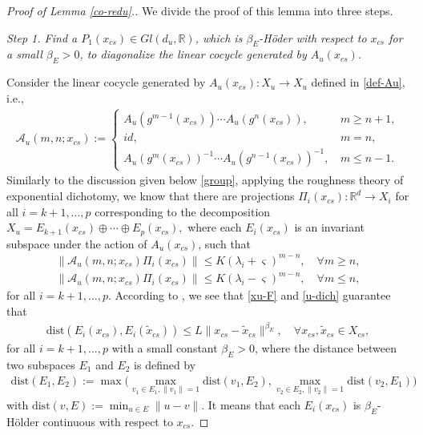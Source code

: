 \documentclass[reqno]{amsart}
\numberwithin{equation}{section}
\begin{document}
\begin{proof}[Proof of Lemma {\rm \ref{co-redu}}.]
We divide the proof of this lemma into three steps.

{\em Step 1.
Find a $P_1(x_{cs})\in Gl(d_u,\mathbb{R})$, which is $\beta_{E}$-H\"{o}der with respect to $x_{cs}$ for a small $\beta_E>0$, to diagonalize the linear cocycle generated by
$A_u(x_{cs})$. }

Consider the linear cocycle generated by $A_u(x_{cs}):X_u\to X_u$ defined in \eqref{def-Au}, i.e.,
\begin{align}\label{group-1}
\mathcal{A}_u(m,n;x_{cs}):=
\begin{cases}
 A_u(g^{m-1}(x_{cs})) \cdots A_u(g^{n}(x_{cs})), \, & m\ge n+1,
\\
id, \, & m=n,
\\
A_u(g^m(x_{cs}))^{-1} \cdots A_u(g^{n-1}(x_{cs}))^{-1}, \, & m\le n-1.
\end{cases}
\end{align}
Similarly to the discussion given below \eqref{group}, applying the roughness theory
 of exponential dichotomy, we know that there are projections $\Pi_i(x_{cs}): \mathbb{R}^d\to X_i$ for all $i=k+1,...,p$ corresponding to the decomposition
 $
X_u=E_{k+1}(x_{cs})\oplus\cdots\oplus E_p(x_{cs}),
 $
 where each $E_i(x_{cs})$ is an invariant subspace under the action of $A_u(x_{cs})$,
 such that
\begin{equation}\label{u-dich}
\begin{split}
\|\mathcal{A}_u(m,n;x_{cs})\Pi_i(x_{cs})\| \le K (\lambda_i + \varsigma)^{m-n}, \quad \forall m\ge n,
\\
\|\mathcal{A}_u(m,n;x_{cs})\Pi_i(x_{cs})\| \le K (\lambda_i -\varsigma)^{m-n}, \quad \forall m\le n,
\end{split}
\end{equation}
for all $i=k+1,...,p$. According to \cite[Proposition 3.9]{Pesin}, we see that \eqref{xu-F} and \eqref{u-dich} guarantee that
\begin{align}\label{E-1}
\mathrm{dist} (E_i(x_{cs}),E_i(\tilde{x}_{cs})) \le L\|x_{cs}-\tilde{x}_{cs}\|^{\beta_E}, \quad \forall x_{cs},\tilde x_{cs}\in X_{cs},
\end{align}
for all $i=k+1,...,p$ with a small constant $\beta_E>0$, where the distance between two subspaces $E_1$ and $E_2$
is defined by
\begin{align}\label{dist-E1E2}
\mathrm{dist}(E_1,E_2):=\max\Big(\max_{v_1\in E_1,\|v_1\|=1} \mathrm{dist} (v_1,E_2), \max_{v_2\in E_2,\|v_2\|=1} \mathrm{dist} (v_2,E_1) \Big)
\end{align}
with $\mathrm{dist}(v,E):=\min_{u\in E}\|u-v\|$. It means that each $E_i(x_{cs})$ is $\beta_E$-H\"older continuous with respect to $x_{cs}$.




\end{proof}
\end{document}
